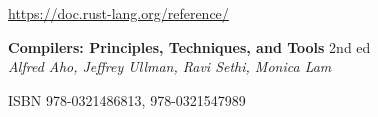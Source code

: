 \clearpage\begin{thebibliography}{99}

 \url{https://doc.rust-lang.org/reference/}

\textbf{Compilers: Principles, Techniques, and Tools} 2nd ed\\
\textit{Alfred Aho, Jeffrey Ullman, Ravi Sethi, Monica Lam}

ISBN 978-0321486813, 978-0321547989\\

\end{thebibliography}
